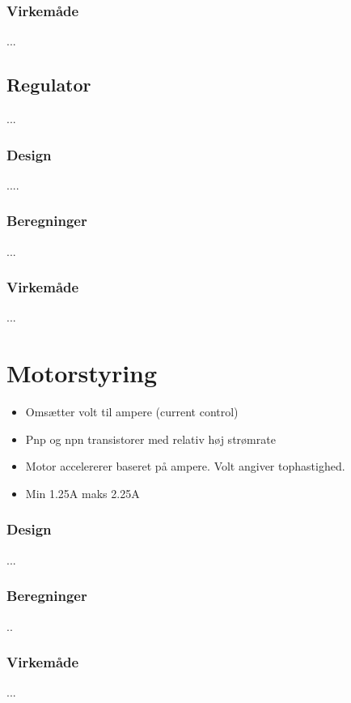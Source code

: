 \subsubsection{Virkemåde}
... 

\subsection{Regulator}
...

\subsubsection{Design}

....

\subsubsection{Beregninger}

...

\subsubsection{Virkemåde}

...
\section{Motorstyring}\label{sec:sec_motorstyring}

\begin{itemize}
	\item Omsætter volt til ampere (current control)
	\item Pnp og npn transistorer med relativ høj strømrate
	\item Motor accelererer baseret på ampere. Volt angiver tophastighed.
	\item Min 1.25A maks 2.25A
\end{itemize}

\subsubsection{Design}
...

\subsubsection{Beregninger}
..

\subsubsection{Virkemåde}
...